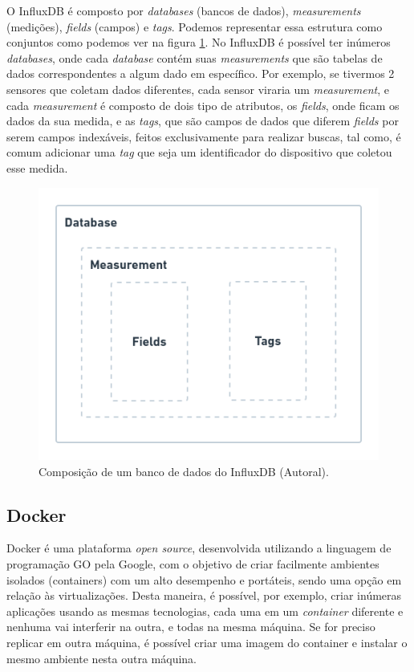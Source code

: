 O InfluxDB é composto por \textit{databases} (bancos de dados), \textit{measurements} (medições), \textit{fields} (campos) e \textit{tags}. Podemos representar essa estrutura como conjuntos como podemos ver na figura \ref{fig:influxdb-struct}. No InfluxDB é possível ter inúmeros \textit{databases}, onde cada \textit{database} contém suas \textit{measurements} que são tabelas de dados correspondentes a algum dado em específico. Por exemplo, se tivermos 2 sensores que coletam dados diferentes, cada sensor viraria um \textit{measurement}, e cada \textit{measurement} é composto  de dois tipo de atributos, os \textit{fields}, onde ficam os dados da sua medida, e as \textit{tags}, que são campos de dados que diferem \textit{fields} por serem campos indexáveis, feitos exclusivamente para realizar buscas, tal como, é comum adicionar uma \textit{tag} que seja um identificador do dispositivo que coletou esse medida.

\begin{figure}[H]
  \centering
  \includegraphics[width=.80\textwidth]{assets/influxdb-struct.png} 
  \caption{Composição de um banco de dados do InfluxDB (Autoral).}
  \label{fig:influxdb-struct} 
\end{figure}

\subsection{Docker}
\label{fund:docker}
Docker é uma plataforma \textit{open source}, desenvolvida utilizando a linguagem de programação GO pela Google, com o objetivo de criar facilmente  ambientes isolados (containers) com um alto desempenho e portáteis, sendo uma opção em relação às virtualizações. Desta maneira, é possível, por exemplo, criar inúmeras aplicações usando as mesmas tecnologias, cada uma em um \textit{container} diferente e nenhuma vai interferir na outra, e todas na mesma máquina. Se for preciso replicar em outra máquina, é possível criar uma imagem do container e instalar o mesmo ambiente nesta outra máquina.

